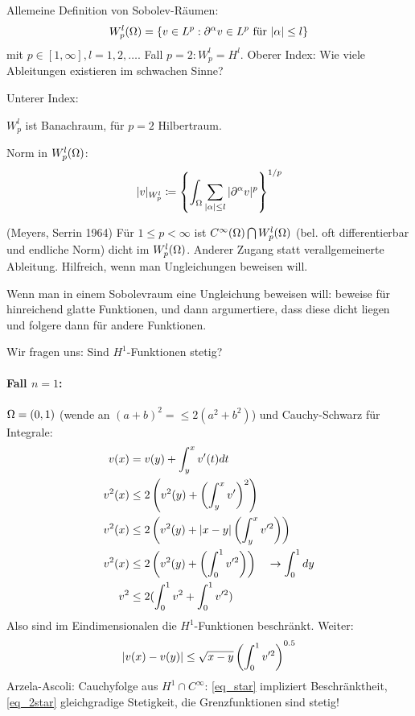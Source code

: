 Allemeine Definition von Sobolev-Räumen:
\begin{align*}
  W_p^l (\Omega) = \{ v \in L^p: \partial^\alpha v \in L^p \text{ für } |\alpha| \leq l \}
\end{align*}
mit $p \in [1, \infty], l = 1, 2, \dots $. Fall $p = 2: W_p^l = H^l$.
Oberer Index: Wie viele Ableitungen existieren im schwachen Sinne?

Unterer Index: 

$W_p^l$ ist Banachraum, für $p = 2$ Hilbertraum.

Norm in $W_p^l(\Omega)$:
\begin{align*}
  |v|_{W_p^l} \coloneqq \left\{\int_\Omega \sum_{|\alpha|\leq l} |\partial^\alpha v|^p \right\} ^{1/p}
\end{align*}
\begin{bemerkung} (Meyers, Serrin 1964)
Für $1 \leq p < \infty$ ist $C^\infty(\Omega) \bigcap W_p^l(\Omega)$ (bel. oft differentierbar und endliche Norm) dicht im $W_p^l(\Omega)$.
Anderer Zugang statt verallgemeinerte Ableitung. Hilfreich, wenn man Ungleichungen beweisen will.

 Wenn man in einem Sobolevraum eine Ungleichung beweisen will: beweise für hinreichend glatte Funktionen, und dann argumertiere, dass diese dicht liegen und folgere dann für andere Funktionen. 
\end{bemerkung}
Wir fragen uns: Sind $H^1$-Funktionen stetig?

\paragraph{Fall $n=1$:} $\Omega = (0,1)$ (wende an $(a+b)^2 = \leq 2(a^2 + b^2)$) und Cauchy-Schwarz für Integrale: 
\begin{align}
  v(x) &= v(y) + \int_y^x v'(t) dt \notag \\
  v^2(x)& \leq 2 \left(v^2(y) + \left(\int_y^x v'\right)^2\right) \notag\\
  v^2(x)& \leq 2 \left(v^2(y) + |x-y| \left(\int_y^x v'^2\right)\right) \notag \\
v^2(x)& \leq 2 \left(v^2(y) +  \left(\int_0^1 v'^2\right)\right) \quad \to \int_0^1 dy \notag\\
v^2 &\leq 2 (\int_0^1 v^2 + \int_0^1 v'^2) \label{eq_star}
\end{align}
Also sind im Eindimensionalen die $H^1$-Funktionen beschränkt. Weiter:
\begin{align}\label{eq_2star}
  |v(x)- v(y)| \leq \sqrt{x-y} \left( \int_0^1 v'^2 \right) ^{0.5}
\end{align}
Arzela-Ascoli: Cauchyfolge aus $H^1 \cap C^\infty$: \eqref{eq_star} impliziert Beschränktheit, \eqref{eq_2star} gleichgradige Stetigkeit, die Grenzfunktionen sind stetig!

